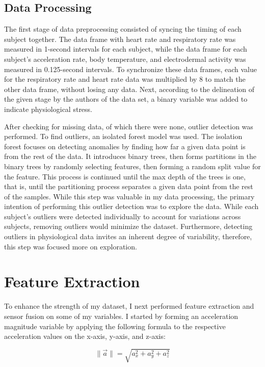 \documentclass{article}
\begin{document}
\subsection{Data Processing}


The first stage of data preprocessing consisted of syncing the timing of each subject together. The data frame with heart rate and respiratory rate was measured in 1-second intervals for each subject, while the data frame for each subject's acceleration rate, body temperature, and electrodermal activity was measured in 0.125-second intervals. To synchronize these data frames, each value for the respiratory rate and heart rate data was multiplied by 8 to match the other data frame, without losing any data. Next, according to the delineation of the given stage by the authors of the data set, a binary variable was added to indicate physiological stress. 

After checking for missing data, of which there were none, outlier detection was performed. To find outliers, an isolated forest model was used. The isolation forest focuses on detecting anomalies by finding how far a given data point is from the rest of the data. It introduces binary trees, then forms partitions in the binary trees by randomly selecting features, then forming a random split value for the feature. This process is continued until the max depth of the trees is one, that is, until the partitioning process separates a given data point from the rest of the samples. While this step was valuable in my data processing, the primary intention of performing this outlier detection was to explore the data. While each subject’s outliers were detected individually to account for variations across subjects, removing outliers would minimize the dataset. Furthermore, detecting outliers in physiological data invites an inherent degree of variability, therefore, this step was focused more on exploration. 


\section{Feature Extraction}

To enhance the strength of my dataset, I next performed feature extraction and sensor fusion on some of my variables. I started by forming an acceleration magnitude variable by applying the following formula to the respective acceleration values on the x-axis, y-axis, and z-axis: 


\begin{equation}
    \|\vec{a}\| = \sqrt{a_x^2 + a_y^2 + a_z^2}
    \label{eq:vector_magnitude}
\end{equation}
\end{document}
